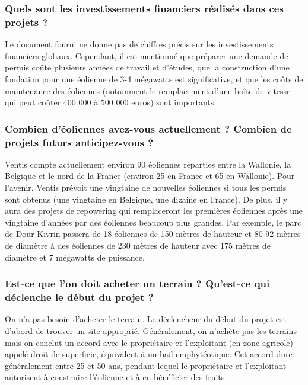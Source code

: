 \subsubsection{Quels sont les investissements financiers réalisés dans ces projets ?}

Le document fourni ne donne pas de chiffres précis sur les investissements financiers globaux. Cependant, il est mentionné que préparer une demande de permis coûte plusieurs années de travail et d'études, que la construction d'une fondation pour une éolienne de 3-4 mégawatts est significative, et que les coûts de maintenance des éoliennes (notamment le remplacement d'une boîte de vitesse qui peut coûter 400 000 à 500 000 euros) sont importants.

\subsubsection{Combien d'éoliennes avez-vous actuellement ? Combien de projets futurs anticipez-vous ?}

Ventis compte actuellement environ 90 éoliennes réparties entre la Wallonie, la Belgique et le nord de la France (environ 25 en France et 65 en Wallonie). Pour l'avenir, Ventis prévoit une vingtaine de nouvelles éoliennes si tous les permis sont obtenus (une vingtaine en Belgique, une dizaine en France). De plus, il y aura des projets de repowering qui remplaceront les premières éoliennes après une vingtaine d'années par des éoliennes beaucoup plus grandes. Par exemple, le parc de Dour-Kivrin passera de 18 éoliennes de 150 mètres de hauteur et 80-92 mètres de diamètre à des éoliennes de 230 mètres de hauteur avec 175 mètres de diamètre et 7 mégawatts de puissance.


\subsubsection{Est-ce que l'on doit acheter un terrain ? Qu'est-ce qui déclenche le début du projet ?}

On n'a pas besoin d'acheter le terrain. Le déclencheur du début du projet est d'abord de trouver un site approprié. Généralement, on n'achète pas les terrains mais on conclut un accord avec le propriétaire et l'exploitant (en zone agricole) appelé droit de superficie, équivalent à un bail emphytéotique. Cet accord dure généralement entre 25 et 50 ans, pendant lequel le propriétaire et l'exploitant autorisent à construire l'éolienne et à en bénéficier des fruits.

